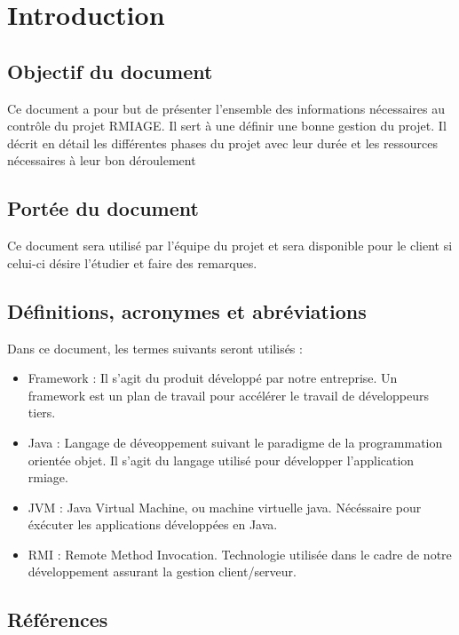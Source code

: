 
\section{Introduction}
\subsection{Objectif du document}
Ce document a pour but de présenter l'ensemble des informations nécessaires au
contrôle du projet RMIAGE. Il sert à une définir une bonne gestion du projet.
Il décrit en détail les différentes phases du projet avec leur durée et les ressources nécessaires à leur bon 	déroulement

\subsection{Portée du document}
Ce document sera utilisé par l’équipe du projet et sera disponible pour le client si celui-ci désire l’étudier et faire des remarques. 

\subsection{Définitions, acronymes et abréviations}
Dans ce document, les termes suivants seront utilisés :
\begin{itemize}
	\item Framework :
Il s'agit du produit développé par notre entreprise. Un framework est un plan de travail pour accélérer le travail de développeurs tiers.
	\item Java :
Langage de déveoppement suivant le paradigme de la programmation orientée objet. Il s'agit du langage utilisé pour développer l'application rmiage.
	\item JVM :
Java Virtual Machine, ou machine virtuelle java. Nécéssaire pour éxécuter les applications développées en Java.
	\item RMI :
Remote Method Invocation. Technologie utilisée dans le cadre de notre développement assurant
la gestion client/serveur.
\end{itemize}

\subsection{Références}
